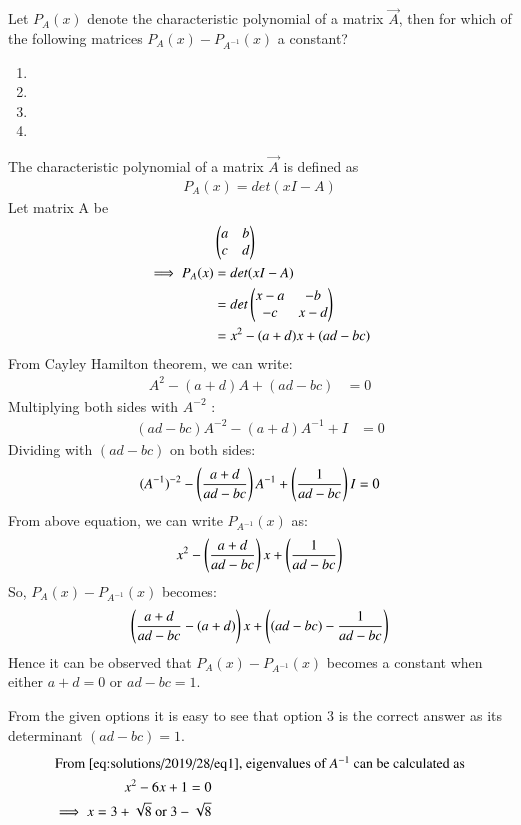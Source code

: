 Let $P_A(x)$ denote the characteristic polynomial of a matrix $\vec{A}$, then for which of the following matrices $P_A(x) - P_{A^{-1}}(x)$ a constant?
\begin{enumerate}
    \item {} \item {} 
    \item {} \item {}
\end{enumerate}
The characteristic polynomial of a matrix $\vec{A}$ is defined as 
\begin{align}
    P_A(x) = det(xI - A)
\end{align}
Let matrix A be 
\begin{align}
      &\begin{pmatrix}a & b \\ c & d\end{pmatrix} \\
    \implies P_A(x) &= det(xI - A) \\
    &= det\begin{pmatrix}x - a & -b \\ -c & x - d\end{pmatrix} \\
    &= x^2 - (a+d)x +(ad - bc) 
\end{align}
From Cayley Hamilton theorem, we can write:
\begin{align}
    A^2 - (a+d)A + (ad-bc) &= 0 
\end{align}
Multiplying both sides with $A^{-2}$ :
\begin{align}
   (ad-bc)A^{-2} - (a+d)A^{-1} + I &= 0 
\end{align}
Dividing with $(ad-bc)$ on both sides:
\begin{align}
      (A^{-1})^{-2} - \left(\frac{a+d}{ad-bc}\right)A^{-1} + \left(\frac{1}{ad-bc}\right)I = 0 \nonumber  
\end{align}
From above equation, we can write $P_{A^{-1}}(x)$ as:
\begin{align}
    x^2 - \left(\frac{a+d}{ad-bc}\right)x + \left(\frac{1}{ad-bc}\right)  \label{eq:solutions/2019/28/eq1}
\end{align}
So, $P_A(x) - P_{A^{-1}}(x)$ becomes:
\begin{align}
    \left(\frac{a+d}{ad-bc} - (a+d)\right)x + \left((ad-bc) - \frac{1}{ad-bc}\right) \nonumber
\end{align}
Hence it can be observed that $P_A(x) - P_{A^{-1}}(x)$ becomes a constant when either $a + d = 0$ or $ad - bc = 1$. 

From the given options it is easy to see that option 3 is the correct answer as its determinant $(ad-bc) = 1$.
\begin{align}
   \intertext{From \eqref{eq:solutions/2019/28/eq1}, eigenvalues of $A^{-1}$ can be calculated as}
    x^2 - 6x + 1 = 0 \\
    \implies x = 3+\sqrt{8} \text{ or } 3-\sqrt{8}
\end{align}
